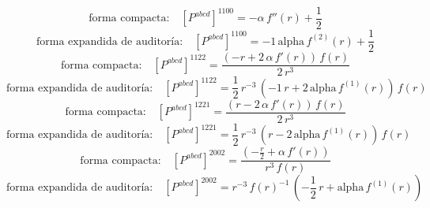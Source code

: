 \documentclass[11pt]{article}
\begin{document}
\begin{dmath*}[breakdepth={5}]
\text{forma compacta:}\quad \left[P^{abcd}\right]^{1100} = -\alpha\,f''\!\left(r\right) + \frac{1}{2}
\end{dmath*}
\begin{dmath*}[breakdepth={5}]
\text{forma expandida de auditoría:}\quad \left[P^{abcd}\right]^{1100} = -1\,\mathrm{alpha}\,f^{(2)}\!\left(r\right) + \frac{1}{2}
\end{dmath*}
\begin{dmath*}[breakdepth={5}]
\text{forma compacta:}\quad \left[P^{abcd}\right]^{1122} = \frac{\left(-r + 2\,\alpha\,f'\!\left(r\right)\right)\,f\!\left(r\right)}{2\,{r}^{3}}
\end{dmath*}
\begin{dmath*}[breakdepth={5}]
\text{forma expandida de auditoría:}\quad \left[P^{abcd}\right]^{1122} = \frac{1}{2}\,{r}^{-3}\,\left(-1\,r + 2\,\mathrm{alpha}\,f^{(1)}\!\left(r\right)\right)\,f\!\left(r\right)
\end{dmath*}
\begin{dmath*}[breakdepth={5}]
\text{forma compacta:}\quad \left[P^{abcd}\right]^{1221} = \frac{\left(r - 2\,\alpha\,f'\!\left(r\right)\right)\,f\!\left(r\right)}{2\,{r}^{3}}
\end{dmath*}
\begin{dmath*}[breakdepth={5}]
\text{forma expandida de auditoría:}\quad \left[P^{abcd}\right]^{1221} = \frac{1}{2}\,{r}^{-3}\,\left(r - 2\,\mathrm{alpha}\,f^{(1)}\!\left(r\right)\right)\,f\!\left(r\right)
\end{dmath*}
\begin{dmath*}[breakdepth={5}]
\text{forma compacta:}\quad \left[P^{abcd}\right]^{2002} = \frac{\left(-\frac{r}{2} + \alpha\,f'\!\left(r\right)\right)}{{r}^{3}\,f\!\left(r\right)}
\end{dmath*}
\begin{dmath*}[breakdepth={5}]
\text{forma expandida de auditoría:}\quad \left[P^{abcd}\right]^{2002} = {r}^{-3}\,{f\!\left(r\right)}^{-1}\,\left(-\frac{1}{2}\,r + \mathrm{alpha}\,f^{(1)}\!\left(r\right)\right)
\end{dmath*}
\end{document}
